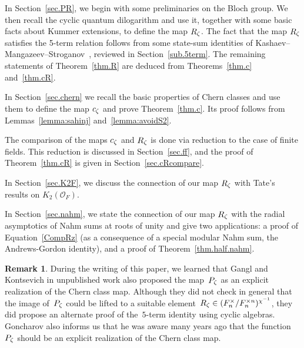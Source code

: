 \documentclass[12pt,reqno]{amsart}
\theoremstyle{definition}
\newtheorem{remark}[theorem]{Remark}
\newcommand{\frankchanged}[1]{{#1}}
\def\calO{\mathcal O}
\def\nn{n}
\begin{document}
In Section~\ref{sec.PR}, \frankchanged{we begin with  some preliminaries on the Bloch group.
We then}
recall the cyclic quantum dilogarithm and
use it, together with some basic facts about Kummer extensions, to define 
the map $R_\zeta$. The fact that the map $R_\zeta$ satisfies the 5-term relation 
follows from some state-sum identities of 
Kashaev--Mangazeev--Stroganov~\cite{KMS}, reviewed in 
Section~\ref{sub.5term}. The remaining statements of Theorem~\ref{thm.R} are 
deduced from Theorems~\ref{thm.c} and~\ref{thm.cR}.

In Section~\ref{sec.chern} we recall the basic properties of Chern classes
and use them to define the map $c_\zeta$ and prove Theorem~\ref{thm.c}.
Its proof follows from Lemmas~\ref{lemma:sahinj} and~\ref{lemma:avoidS2}.

The comparison of the maps $c_\zeta$ and $R_\zeta$ is done via reduction
to the case of finite fields. This reduction is discussed in 
Section~\ref{sec.ff}, and the proof of Theorem~\ref{thm.cR} is given in
Section~\ref{sec.cRcompare}.

In Section~\ref{sec.K2F}, we discuss the connection of our map $R_\zeta$ 
with Tate's results on $K_2(\calO_F)$.


In Section~\ref{sec.nahm}, we state the
connection of our map $R_\zeta$ with the radial asymptotics of Nahm sums
at roots of unity and give two applications: a proof of 
Equation~\eqref{CompRz} (as a consequence of a special modular Nahm sum, 
the Andrews-Gordon identity), and a proof of Theorem~\ref{thm.half.nahm}.


\begin{remark}
During the writing of this paper, we learned that Gangl and 
Kontsevich in unpublished work also proposed the map~$P_{\zeta}$ as an explicit 
realization of the Chern class map. Although they did not check
in general that the image of~$P_{\zeta}$ could be lifted to a suitable 
element~$R_{\z} \in (F^{\times}_{\nn}/F^{\times \nn}_{\nn})^{\chi\i}$, they did 
propose an alternate proof of the~$5$-term identity using cyclic algebras. 
Goncharov also informs us that he was aware many years ago that the 
function~$P_{\zeta}$ should be an explicit realization of the Chern class map.
\end{remark}
\end{document}
